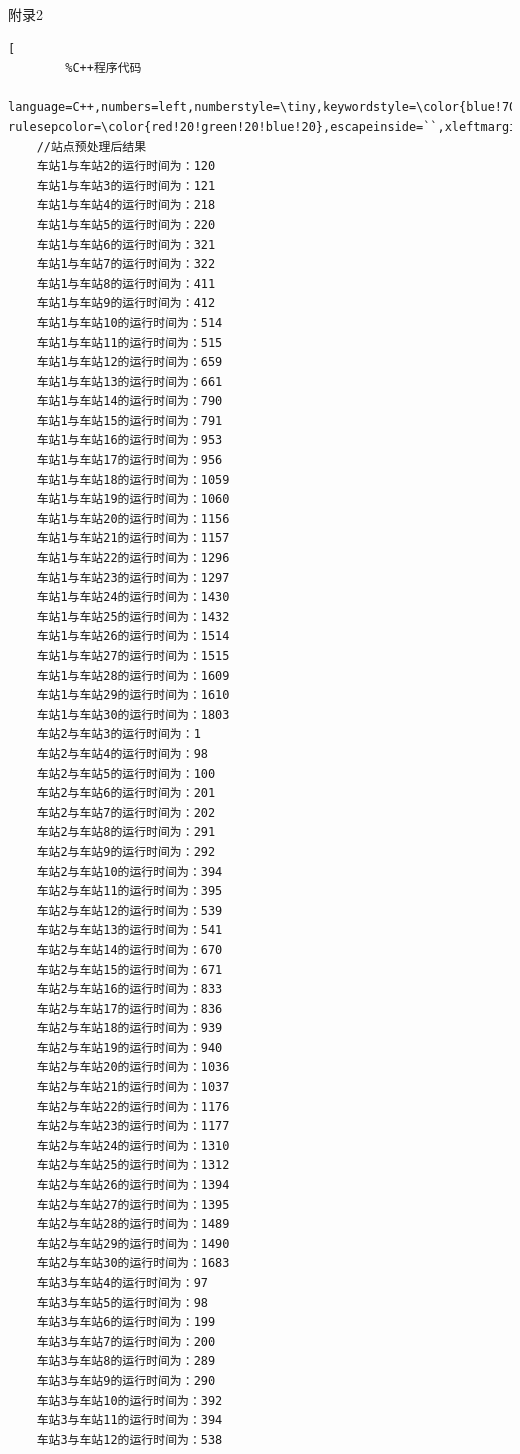 \documentclass[UTF8]{ctexart}
\begin{document}
\begin{center}
	\sihao \heiti 附录2
	
	
	\fontsize{10pt}{16pt}		\selectfont	
	\begin{lstlisting}[ 
		%C++程序代码
		language=C++,numbers=left,numberstyle=\tiny,keywordstyle=\color{blue!70},commentstyle=\color{red!50!green!50!blue!50},frame=shadowbox, rulesepcolor=\color{red!20!green!20!blue!20},escapeinside=``,xleftmargin=2em,xrightmargin=2em,aboveskip=1em] 
	//站点预处理后结果
	车站1与车站2的运行时间为：120
	车站1与车站3的运行时间为：121
	车站1与车站4的运行时间为：218
	车站1与车站5的运行时间为：220
	车站1与车站6的运行时间为：321
	车站1与车站7的运行时间为：322
	车站1与车站8的运行时间为：411
	车站1与车站9的运行时间为：412
	车站1与车站10的运行时间为：514
	车站1与车站11的运行时间为：515
	车站1与车站12的运行时间为：659
	车站1与车站13的运行时间为：661
	车站1与车站14的运行时间为：790
	车站1与车站15的运行时间为：791
	车站1与车站16的运行时间为：953
	车站1与车站17的运行时间为：956
	车站1与车站18的运行时间为：1059
	车站1与车站19的运行时间为：1060
	车站1与车站20的运行时间为：1156
	车站1与车站21的运行时间为：1157
	车站1与车站22的运行时间为：1296
	车站1与车站23的运行时间为：1297
	车站1与车站24的运行时间为：1430
	车站1与车站25的运行时间为：1432
	车站1与车站26的运行时间为：1514
	车站1与车站27的运行时间为：1515
	车站1与车站28的运行时间为：1609
	车站1与车站29的运行时间为：1610
	车站1与车站30的运行时间为：1803
	车站2与车站3的运行时间为：1
	车站2与车站4的运行时间为：98
	车站2与车站5的运行时间为：100
	车站2与车站6的运行时间为：201
	车站2与车站7的运行时间为：202
	车站2与车站8的运行时间为：291
	车站2与车站9的运行时间为：292
	车站2与车站10的运行时间为：394
	车站2与车站11的运行时间为：395
	车站2与车站12的运行时间为：539
	车站2与车站13的运行时间为：541
	车站2与车站14的运行时间为：670
	车站2与车站15的运行时间为：671
	车站2与车站16的运行时间为：833
	车站2与车站17的运行时间为：836
	车站2与车站18的运行时间为：939
	车站2与车站19的运行时间为：940
	车站2与车站20的运行时间为：1036
	车站2与车站21的运行时间为：1037
	车站2与车站22的运行时间为：1176
	车站2与车站23的运行时间为：1177
	车站2与车站24的运行时间为：1310
	车站2与车站25的运行时间为：1312
	车站2与车站26的运行时间为：1394
	车站2与车站27的运行时间为：1395
	车站2与车站28的运行时间为：1489
	车站2与车站29的运行时间为：1490
	车站2与车站30的运行时间为：1683
	车站3与车站4的运行时间为：97
	车站3与车站5的运行时间为：98
	车站3与车站6的运行时间为：199
	车站3与车站7的运行时间为：200
	车站3与车站8的运行时间为：289
	车站3与车站9的运行时间为：290
	车站3与车站10的运行时间为：392
	车站3与车站11的运行时间为：394
	车站3与车站12的运行时间为：538

\end{lstlisting}
\end{center}
\end{document}
